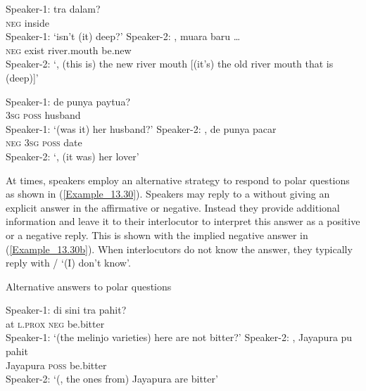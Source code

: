 \ea
\label{Example_13.28}
\ea
\label{Example_13.28a}
\gll Speaker-1:  tra  dalam?\\ %
 {}    \textsc{neg}  inside\\
 Speaker-1: ‘isn’t (it) deep?’
\vspace{10pt}
\ex
\label{Example_13.28b}
\gll   Speaker-2:    ,  muara  baru  \ldots\\
  {}   \textsc{neg}  exist  river.mouth  be.new  \\
\glt Speaker-2: ‘, (this is) the new river mouth [(it’s) the old river mouth that is (deep)]’ \textstyleExampleSource{[080927-003-Cv.0010-0011]}
\z
\z

\ea
\label{Example_13.29}
\ea
\label{Example_13.29a}
\gll Speaker-1:  de  punya  paytua?\\ %
  {}   \textsc{3sg}  \textsc{poss}  husband\\
\glt Speaker-1: ‘(was it) her husband?’
\vspace{10pt}
\ex
\label{Example_13.29b}
\gll    Speaker-2:  ,  de  punya  pacar\\
 {}    \textsc{neg}  \textsc{3sg}  \textsc{poss}  date\\
\glt Speaker-2: ‘, (it was) her lover’ \textstyleExampleSource{[081006-022-CvEx.0044-0045]}
\z
\z

At times, speakers employ an alternative strategy to respond to polar questions as shown in (\ref{Example_13.30}). Speakers may reply to a  without giving an explicit answer in the affirmative or negative. Instead they provide additional information and leave it to their interlocutor to interpret this answer as a positive or a negative reply. This is shown with the implied negative answer in (\ref{Example_13.30b}). When interlocutors do not know the answer, they typically reply with / ‘(I) don’t know’.


\begin{styleExampleTitle}
Alternative answers to polar questions
\end{styleExampleTitle}
\ea
\label{Example_13.30}
\ea
\label{Examle_13.30a}
\gll Speaker-1:  di  sini  tra  pahit?\\ %
  {}   at  \textsc{l.prox}  \textsc{neg}  be.bitter\\
 Speaker-1: ‘(the melinjo varieties) here are not bitter?’
\vspace{10pt}
\ex
\label{Example_13.30b}
\gll  Speaker-2:  {},  Jayapura  pu  pahit\\
 {}  {}    Jayapura  \textsc{poss}  be.bitter\\
\glt Speaker-2: ‘(, the ones from) Jayapura are bitter’ \textstyleExampleSource{[080923-004-Cv.0011-0012]}
\z
\z

